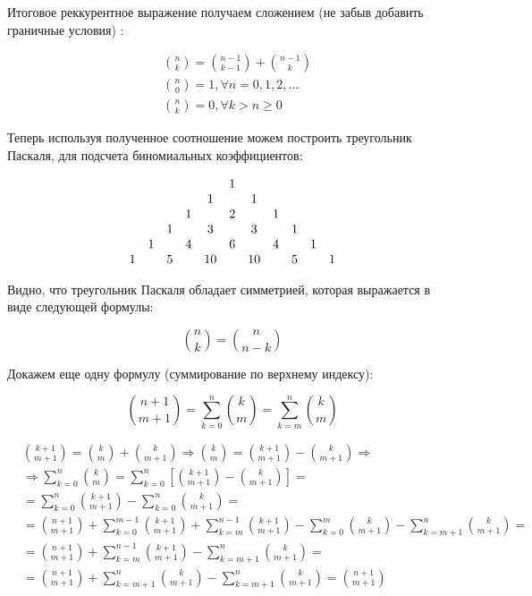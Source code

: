 Итоговое реккурентное выражение получаем сложением (не забыв добавить граничные условия) :

\begin{equation}
	\begin{split}
		& \binom{n}{k} = \binom{n-1}{k-1} + \binom{n-1}{k} \\
		& \binom{n}{0} = 1, \forall n = 0, 1, 2, ... \\
		& \binom{n}{k} = 0, \forall k > n \ge 0
	\end{split}
	\label{math::recurrent_binom}
\end{equation}

Теперь используя полученное соотношение можем построить треугольник Паскаля, для подсчета биномиальных коэффициентов:

\[
	\setcounter{MaxMatrixCols}{15}
	\begin{matrix}
		&&&&& 1 \\
		&&&& 1 && 1 \\
		&&& 1 && 2 && 1 \\
		&& 1 && 3 && 3 && 1 \\
		& 1 && 4 && 6 && 4 && 1 \\
		1 && 5 && 10 && 10 && 5 && 1\\
	\end{matrix}
\]

Видно, что треугольник Паскаля обладает симметрией, которая выражается в виде следующей формулы:

\begin{equation}
	\binom{n}{k} = \binom{n}{n-k}
\end{equation}

Докажем еще одну формулу (суммирование по верхнему индексу):

\begin{equation}
	\binom{n+1}{m+1} = \sum_{k=0}^n \binom{k}{m} = \sum_{k=m}^{n} \binom{k}{m}
\end{equation}

\begin{Proof}
	\[
		\begin{split}
			& \binom{k+1}{m+1} = \binom{k}{m} + \binom{k}{m+1} \Rightarrow \binom{k}{m} = \binom{k+1}{m+1} - \binom{k}{m+1} \Rightarrow \\
			& \Rightarrow \sum_{k=0}^n \binom{k}{m} = \sum_{k=0}^n \left[ \binom{k+1}{m+1} - \binom{k}{m+1} \right] = \\
			& = \sum_{k=0}^n \binom{k+1}{m+1} - \sum_{k=0}^n \binom{k}{m+1} = \\
			& = \binom{n+1}{m+1} + \sum_{k=0}^{m-1} \binom{k+1}{m+1} + \sum_{k=m}^{n-1} \binom{k+1}{m+1} - \sum_{k=0}^m \binom{k}{m+1} - \sum_{k=m+1}^n \binom{k}{m+1} = \\
			& = \binom{n+1}{m+1} + \sum_{k=m}^{n-1} \binom{k+1}{m+1} - \sum_{k=m+1}^n \binom{k}{m+1} = \\
			& = \binom{n+1}{m+1} + \sum_{k=m+1}^n \binom{k}{m+1} - \sum_{k=m+1}^n \binom{k}{m+1} = \binom{n+1}{m+1}
		\end{split}
	\]
\end{Proof}

